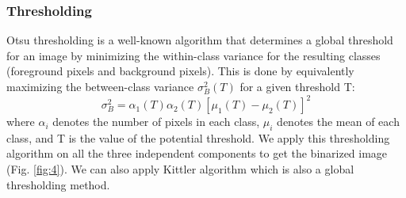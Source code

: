 \subsubsection{Thresholding}

Otsu thresholding \cite{A2} is a well-known algorithm that
determines a global threshold for an image by minimizing 
the within-class variance for the resulting classes (foreground pixels 
and background pixels). This is
done by equivalently maximizing the between-class variance
$\sigma _{B}^{2}(T)$ for a given threshold T:
\begin{equation}
\sigma_{B}^{2}=\alpha_1(T)\alpha_2(T)[\mu_1(T)-\mu_2(T)]^2 
\end{equation}
where $\alpha_i$ denotes the number of pixels in each class, $\mu_i$ denotes 
the mean of each class, and T is the value of the potential threshold. 
We apply this thresholding algorithm on all the three independent components to get the binarized image (Fig. \ref{fig:4}).
We can also apply Kittler \cite{A5} algorithm which is also a global thresholding method.
